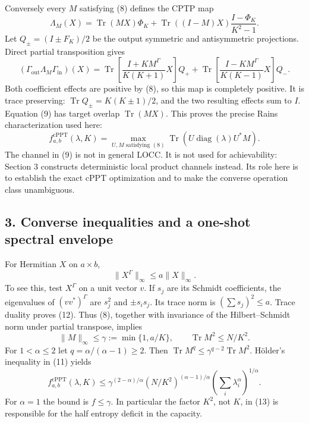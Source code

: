 \documentclass[11pt]{article}
\begin{document}
Conversely every \(M\) satisfying (8) defines the CPTP map \[
 \Lambda_M(X)=\operatorname{Tr}(MX)\Phi_K+
 \operatorname{Tr}((I-M)X)\frac{I-\Phi_K}{K^2-1}.
 \tag{9}
\] Let \(Q_\pm=(I\pm F_K)/2\) be the output symmetric and antisymmetric projections. Direct partial transposition gives \[
 (\Gamma_{\mathrm{out}}\Lambda_M\Gamma_{\mathrm{in}})(X)
 =\operatorname{Tr}\!\left[\frac{I+KM^\Gamma}{K(K+1)}X\right]Q_+
 +\operatorname{Tr}\!\left[\frac{I-KM^\Gamma}{K(K-1)}X\right]Q_-.
 \tag{10}
\] Both coefficient effects are positive by (8), so this map is completely positive. It is trace preserving: \(\operatorname{Tr}Q_\pm=K(K\pm1)/2\), and the two resulting effects sum to \(I\). Equation (9) has target overlap \(\operatorname{Tr}(MX)\). This proves the precise Rains characterization used here: \[
 f_{a,b}^{\mathrm{cPPT}}(\lambda,K)
 =\max_{U,M\text{ satisfying }(8)}\operatorname{Tr}(U\operatorname{diag}(\lambda)U^*M).
 \tag{11}
\] The channel in (9) is not in general LOCC. It is not used for achievability: Section 3 constructs deterministic local product channels instead. Its role here is to establish the exact cPPT optimization and to make the converse operation class unambiguous.

\hypertarget{converse-inequalities-and-a-one-shot-spectral-envelope}{%
\subsection{3. Converse inequalities and a one-shot spectral envelope}\label{converse-inequalities-and-a-one-shot-spectral-envelope}}

For Hermitian \(X\) on \(a\times b\), \[
 \|X^\Gamma\|_\infty\le a\|X\|_\infty.
 \tag{12}
\] To see this, test \(X^\Gamma\) on a unit vector \(v\). If \(s_j\) are its Schmidt coefficients, the eigenvalues of \((vv^*)^\Gamma\) are \(s_j^2\) and \(\pm s_i s_j\). Its trace norm is \((\sum s_j)^2\le a\). Trace duality proves (12). Thus (8), together with invariance of the Hilbert--Schmidt norm under partial transpose, implies \[
 \|M\|_\infty\le\gamma:=\min\{1,a/K\},\qquad
 \operatorname{Tr}M^2\le N/K^2.
 \tag{13}
\] For \(1<\alpha\le2\) let \(q=\alpha/(\alpha-1)\ge2\). Then \(\operatorname{Tr}M^q\le\gamma^{q-2}\operatorname{Tr}M^2\). Hölder's inequality in (11) yields \[
 f_{a,b}^{\mathrm{cPPT}}(\lambda,K)
 \le\gamma^{(2-\alpha)/\alpha}
       (N/K^2)^{(\alpha-1)/\alpha}
       \left(\sum_i\lambda_i^\alpha\right)^{1/\alpha}.
 \tag{14}
\] For \(\alpha=1\) the bound is \(f\le\gamma\). In particular the factor \(K^2\), not \(K\), in (13) is responsible for the half entropy deficit in the capacity.
\end{document}

